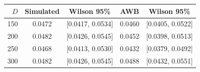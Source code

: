\begin{tabular}{rcccc}
\toprule
$D$ & Simulated & Wilson 95\% & AWB & Wilson 95\% \\
\midrule
150 & 0.0472 & [0.0417, 0.0534] & 0.0460 & [0.0405, 0.0522] \\
200 & 0.0482 & [0.0426, 0.0545] & 0.0452 & [0.0398, 0.0513] \\
250 & 0.0468 & [0.0413, 0.0530] & 0.0432 & [0.0379, 0.0492] \\
300 & 0.0482 & [0.0426, 0.0545] & 0.0488 & [0.0432, 0.0551] \\
\bottomrule
\end{tabular}
